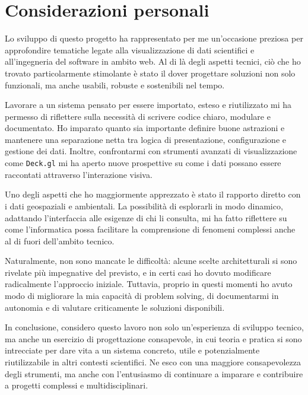 \section{Considerazioni personali}
\label{ss:considerazioni-personali}

Lo sviluppo di questo progetto ha rappresentato per me un'occasione preziosa per approfondire tematiche legate alla visualizzazione di dati scientifici e all'ingegneria del software in ambito web. Al di là degli aspetti tecnici, ciò che ho trovato particolarmente stimolante è stato il dover progettare soluzioni non solo funzionali, ma anche usabili, robuste e sostenibili nel tempo.
\vspace{0.5em}

\noindent

Lavorare a un sistema pensato per essere importato, esteso e riutilizzato mi ha permesso di riflettere sulla necessità di scrivere codice chiaro, modulare e documentato. Ho imparato quanto sia importante definire buone astrazioni e mantenere una separazione netta tra logica di presentazione, configurazione e gestione dei dati. Inoltre, confrontarmi con strumenti avanzati di visualizzazione come \texttt{Deck.gl} mi ha aperto nuove prospettive su come i dati possano essere raccontati attraverso l'interazione visiva.

\vspace{0.5em}

\noindent

Uno degli aspetti che ho maggiormente apprezzato è stato il rapporto diretto con i dati geospaziali e ambientali. La possibilità di esplorarli in modo dinamico, adattando l'interfaccia alle esigenze di chi li consulta, mi ha fatto riflettere su come l'informatica possa facilitare la comprensione di fenomeni complessi anche al di fuori dell'ambito tecnico.

\vspace{0.5em}

\noindent
Naturalmente, non sono mancate le difficoltà: alcune scelte architetturali si sono rivelate più impegnative del previsto, e in certi casi ho dovuto modificare radicalmente l'approccio iniziale. Tuttavia, proprio in questi momenti ho avuto modo di migliorare la mia capacità di problem solving, di documentarmi in autonomia e di valutare criticamente le soluzioni disponibili.

\vspace{0.5em}

\noindent
In conclusione, considero questo lavoro non solo un'esperienza di sviluppo tecnico, ma anche un esercizio di progettazione consapevole, in cui teoria e pratica si sono intrecciate per dare vita a un sistema concreto, utile e potenzialmente riutilizzabile in altri contesti scientifici. Ne esco con una maggiore consapevolezza degli strumenti, ma anche con l'entusiasmo di continuare a imparare e contribuire a progetti complessi e multidisciplinari.